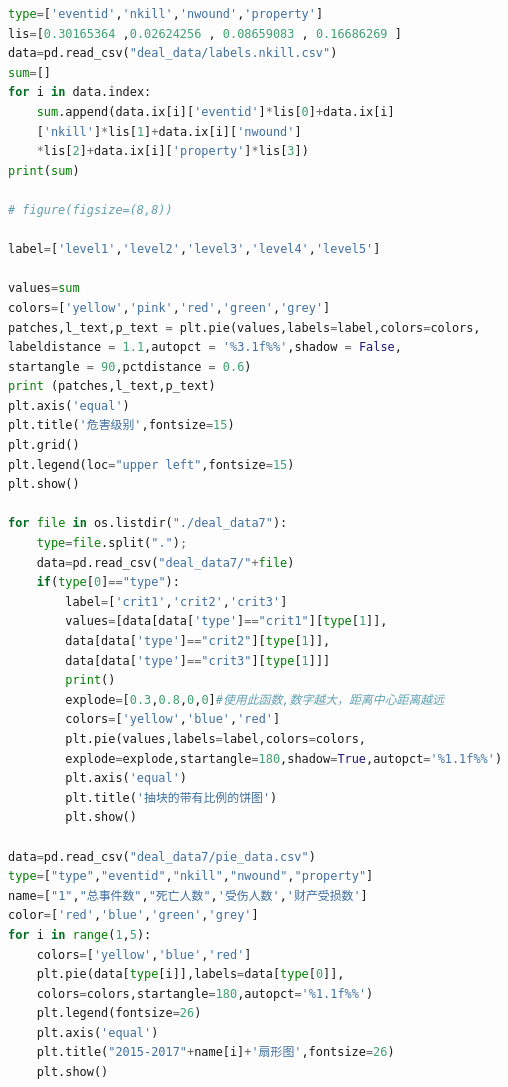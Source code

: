 \documentclass[bwprint]{gmcmthesis}
\begin{document}
\begin{lstlisting}[language=Python]
type=['eventid','nkill','nwound','property']
lis=[0.30165364 ,0.02624256 , 0.08659083 , 0.16686269 ]
data=pd.read_csv("deal_data/labels.nkill.csv")
sum=[]
for i in data.index:
    sum.append(data.ix[i]['eventid']*lis[0]+data.ix[i]
    ['nkill']*lis[1]+data.ix[i]['nwound']
    *lis[2]+data.ix[i]['property']*lis[3])
print(sum)

# figure(figsize=(8,8))

label=['level1','level2','level3','level4','level5']

values=sum
colors=['yellow','pink','red','green','grey']
patches,l_text,p_text = plt.pie(values,labels=label,colors=colors,
labeldistance = 1.1,autopct = '%3.1f%%',shadow = False,
startangle = 90,pctdistance = 0.6)
print (patches,l_text,p_text)
plt.axis('equal')
plt.title('危害级别',fontsize=15)
plt.grid()
plt.legend(loc="upper left",fontsize=15)
plt.show()

for file in os.listdir("./deal_data7"):
    type=file.split(".");
    data=pd.read_csv("deal_data7/"+file)
    if(type[0]=="type"):
        label=['crit1','crit2','crit3']
        values=[data[data['type']=="crit1"][type[1]],
        data[data['type']=="crit2"][type[1]],
        data[data['type']=="crit3"][type[1]]]
        print()
        explode=[0.3,0.8,0,0]#使用此函数,数字越大，距离中心距离越远
        colors=['yellow','blue','red']
        plt.pie(values,labels=label,colors=colors,
        explode=explode,startangle=180,shadow=True,autopct='%1.1f%%')
        plt.axis('equal')
        plt.title('抽块的带有比例的饼图')
        plt.show()

data=pd.read_csv("deal_data7/pie_data.csv")
type=["type","eventid","nkill","nwound","property"]
name=["1","总事件数","死亡人数",'受伤人数','财产受损数']
color=['red','blue','green','grey']
for i in range(1,5):
    colors=['yellow','blue','red']
    plt.pie(data[type[i]],labels=data[type[0]],
    colors=colors,startangle=180,autopct='%1.1f%%')
    plt.legend(fontsize=26)
    plt.axis('equal')
    plt.title("2015-2017"+name[i]+'扇形图',fontsize=26)
    plt.show()

\end{lstlisting}
\end{document}
